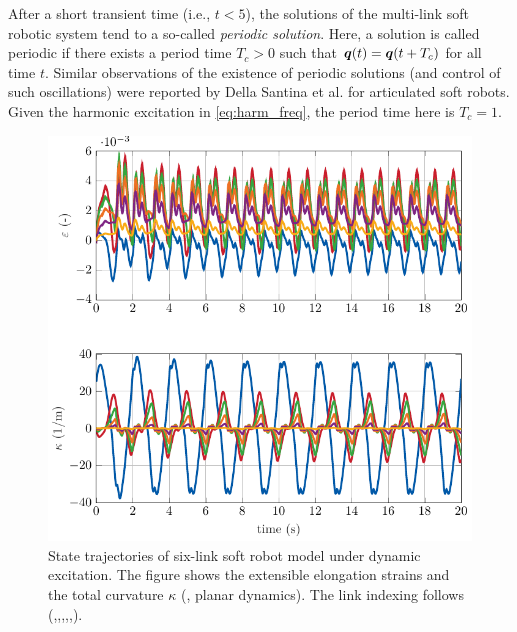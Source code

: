 \begin{rmk}
After a short transient time (i.e., $t < 5$), the solutions of the multi-link soft robotic system tend to a so-called \emph{periodic solution}. Here, a solution is called periodic if there exists a period time $T_c >  0$ such that ${\boldsymbol{q}}(t) = {\boldsymbol{q}}(t + T_c)$ for all time $t$. Similar observations of the existence of periodic solutions (and control of such oscillations) were reported by Della Santina et al. \cite{DellaSantina2021} for articulated soft robots. Given the harmonic excitation in \eqref{eq:harm_freq}, the period time here is $T_c = 1$.
\end{rmk}

%
\begin{figure}[!t]
  \centering
  \includegraphics*{./pdf/thesis-figure-4-19.pdf}
  \vspace{-2mm}
  \caption{State trajectories of six-link soft robot model under dynamic excitation. The figure shows the extensible elongation strains and the total curvature $\kappa$ (\ie, planar dynamics). The link indexing follows (,,,,,). \label{fig:C2:multilink_states}}
\end{figure}

